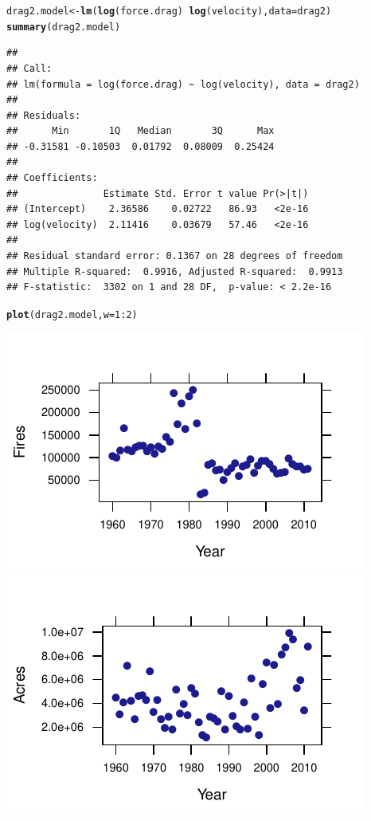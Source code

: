 \documentclass[twoside]{book}
\makeatletter
\def\maxwidth{ %
  \ifdim\Gin@nat@width>\linewidth
    \linewidth
  \else
    \Gin@nat@width
  \fi
}
\newcommand{\hlnum}[1]{\textcolor[rgb]{0.686,0.059,0.569}{#1}}%
\newcommand{\hlopt}[1]{\textcolor[rgb]{0,0,0}{#1}}%
\newcommand{\hlstd}[1]{\textcolor[rgb]{0.345,0.345,0.345}{#1}}%
\newcommand{\hlkwb}[1]{\textcolor[rgb]{0.69,0.353,0.396}{#1}}%
\newcommand{\hlkwc}[1]{\textcolor[rgb]{0.333,0.667,0.333}{#1}}%
\newcommand{\hlkwd}[1]{\textcolor[rgb]{0.737,0.353,0.396}{\textbf{#1}}}%
\newenvironment{kframe}{%
 \def\at@end@of@kframe{}%
 \ifinner\ifhmode%
  \def\at@end@of@kframe{\end{minipage}}%
  \begin{minipage}{\columnwidth}%
 \fi\fi%
 \def\FrameCommand##1{\hskip\@totalleftmargin \hskip-\fboxsep
 \colorbox{shadecolor}{##1}\hskip-\fboxsep
     \hskip-\linewidth \hskip-\@totalleftmargin \hskip\columnwidth}%
 \MakeFramed {\advance\hsize-\width
   \@totalleftmargin\z@ \linewidth\hsize
   \@setminipage}}%
 {\par\unskip\endMakeFramed%
 \at@end@of@kframe}
\newenvironment{knitrout}{}{} %
\makeatother
\begin{document}
\begin{solution}
\begin{knitrout}
\end{knitrout}
\begin{knitrout}
\color{fgcolor}\begin{kframe}
\begin{alltt}
\hlstd{drag2.model} \hlkwb{<-} \hlkwd{lm}\hlstd{(}\hlkwd{log}\hlstd{(force.drag)} \hlopt{~} \hlkwd{log}\hlstd{(velocity),} \hlkwc{data} \hlstd{= drag2)}
\hlkwd{summary}\hlstd{(drag2.model)}
\end{alltt}
\begin{verbatim}
## 
## Call:
## lm(formula = log(force.drag) ~ log(velocity), data = drag2)
## 
## Residuals:
##      Min       1Q   Median       3Q      Max 
## -0.31581 -0.10503  0.01792  0.08009  0.25424 
## 
## Coefficients:
##               Estimate Std. Error t value Pr(>|t|)
## (Intercept)    2.36586    0.02722   86.93   <2e-16
## log(velocity)  2.11416    0.03679   57.46   <2e-16
## 
## Residual standard error: 0.1367 on 28 degrees of freedom
## Multiple R-squared:  0.9916,	Adjusted R-squared:  0.9913 
## F-statistic:  3302 on 1 and 28 DF,  p-value: < 2.2e-16
\end{verbatim}
\begin{alltt}
\hlkwd{plot}\hlstd{(drag2.model,} \hlkwc{w} \hlstd{=} \hlnum{1}\hlopt{:}\hlnum{2}\hlstd{)}
\end{alltt}
\end{kframe}

{\centering \includegraphics[width=\maxwidth]{figures/fig-unnamed-chunk-30-1} 
\includegraphics[width=\maxwidth]{figures/fig-unnamed-chunk-30-2} 

}
\end{knitrout}
\end{solution}
\end{document}
